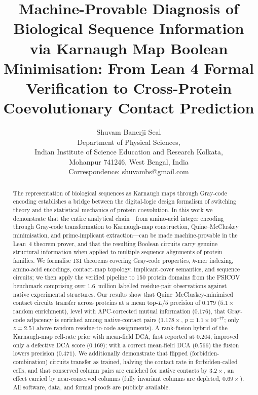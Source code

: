 \documentclass[11pt,a4paper,]{article}
\begin{document}
\title{Machine-Provable Diagnosis of Biological Sequence Information via Karnaugh Map Boolean Minimisation: From Lean 4 Formal Verification to Cross-Protein Coevolutionary Contact Prediction}

\author{
	Shuvam Banerji Seal\\
	\small Department of Physical Sciences,\\
	\small Indian Institute of Science Education and Research Kolkata,\\
	\small Mohanpur 741246, West Bengal, India\\
	\small Correspondence: shuvambs@gmail.com
}
\date{}

\maketitle

\begin{abstract}
	\noindent
	The representation of biological sequences as Karnaugh maps through Gray-code
	encoding establishes a bridge between the digital-logic design formalism of
	switching theory and the statistical mechanics of protein coevolution.  In this
	work we demonstrate that the entire analytical chain---from amino-acid integer
	encoding through Gray-code transformation to Karnaugh-map construction,
	Quine--McCluskey minimisation, and prime-implicant extraction---can be made
	machine-provable in the Lean~4 theorem prover, and that the resulting Boolean
	circuits carry genuine structural information when applied to multiple sequence
	alignments of protein families.  We formalise 131 theorems covering Gray-code
	properties, $k$-mer indexing, amino-acid encodings, contact-map topology,
	implicant-cover semantics, and sequence circuits; we then apply the verified pipeline to 150 protein
	domains from the PSICOV benchmark comprising over 1.6~million labelled residue-pair
	observations against native experimental structures.  Our results show that
	Quine--McCluskey-minimised contact circuits transfer across proteins at a mean
	top-$L/5$ precision of $0.179$ ($5.1\times$ random enrichment), level with
	APC-corrected mutual information ($0.176$), that Gray-code
	adjacency is enriched among native-contact pairs ($1.178\times$, $p =
		1.1\times10^{-77}$; only $z = 2.51$ above random residue-to-code
	assignments).  A rank-fusion hybrid of the Karnaugh-map cell-rate prior
	with mean-field DCA, first reported at $0.204$, improved only a defective
	DCA score ($0.169$); with a correct mean-field DCA ($0.566$) the fusion
	lowers precision ($0.471$).  We additionally
	demonstrate that flipped (forbidden-combination) circuits transfer as
	trained, halving the contact rate in forbidden-called cells, and that
	conserved column pairs are enriched
	for native contacts by $3.2\times$, an effect carried by near-conserved
	columns (fully invariant columns are depleted, $0.69\times$).  All software, data, and formal proofs are
	publicly available.
\end{abstract}
\end{document}
